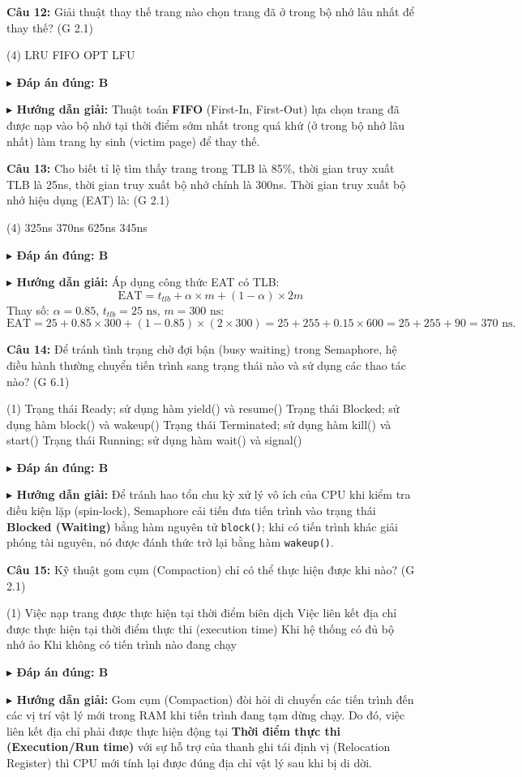 \documentclass[11pt,a4paper]{article}
\newcommand{\giaithich}[2]{%
    \par\vspace{0.15cm}\noindent
    \begingroup\small
    \noindent\textbf{\color{blue}$\blacktriangleright$ Đáp án đúng: #1} \par\vspace{0.08cm}
    \noindent\textbf{\color{teal}$\blacktriangleright$ Hướng dẫn giải:} #2
    \endgroup\par\vspace{0.35cm}
}
\begin{document}
\noindent\textbf{Câu 12:} Giải thuật thay thế trang nào chọn trang đã ở trong bộ nhớ lâu nhất để thay thế? (G 2.1)
\begin{tasks}(4)
    \task LRU
    \task FIFO
    \task OPT
    \task LFU
\end{tasks}
\giaithich{B}{Thuật toán \textbf{FIFO} (First-In, First-Out) lựa chọn trang đã được nạp vào bộ nhớ tại thời điểm sớm nhất trong quá khứ (ở trong bộ nhớ lâu nhất) làm trang hy sinh (victim page) để thay thế.}

\noindent\textbf{Câu 13:} Cho biết tỉ lệ tìm thấy trang trong TLB là 85\%, thời gian truy xuất TLB là 25ns, thời gian truy xuất bộ nhớ chính là 300ns. Thời gian truy xuất bộ nhớ hiệu dụng (EAT) là: (G 2.1)
\begin{tasks}(4)
    \task 325ns
    \task 370ns
    \task 625ns
    \task 345ns
\end{tasks}
\giaithich{B}{Áp dụng công thức EAT có TLB:
$$\text{EAT} = t_{tlb} + \alpha \times m + (1 - \alpha) \times 2m$$
Thay số: $\alpha = 0.85$, $t_{tlb} = 25\text{ ns}$, $m = 300\text{ ns}$:
$$\text{EAT} = 25 + 0.85 \times 300 + (1 - 0.85) \times (2 \times 300) = 25 + 255 + 0.15 \times 600 = 25 + 255 + 90 = 370\text{ ns.}$$}

\noindent\textbf{Câu 14:} Để tránh tình trạng chờ đợi bận (busy waiting) trong Semaphore, hệ điều hành thường chuyển tiến trình sang trạng thái nào và sử dụng các thao tác nào? (G 6.1)
\begin{tasks}(1)
    \task Trạng thái Ready; sử dụng hàm yield() và resume()
    \task Trạng thái Blocked; sử dụng hàm block() và wakeup()
    \task Trạng thái Terminated; sử dụng hàm kill() và start()
    \task Trạng thái Running; sử dụng hàm wait() và signal()
\end{tasks}
\giaithich{B}{Để tránh hao tổn chu kỳ xử lý vô ích của CPU khi kiểm tra điều kiện lặp (spin-lock), Semaphore cải tiến đưa tiến trình vào trạng thái \textbf{Blocked (Waiting)} bằng hàm nguyên tử \texttt{block()}; khi có tiến trình khác giải phóng tài nguyên, nó được đánh thức trở lại bằng hàm \texttt{wakeup()}.}

\noindent\textbf{Câu 15:} Kỹ thuật gom cụm (Compaction) chỉ có thể thực hiện được khi nào? (G 2.1)
\begin{tasks}(1)
    \task Việc nạp trang được thực hiện tại thời điểm biên dịch
    \task Việc liên kết địa chỉ được thực hiện tại thời điểm thực thi (execution time)
    \task Khi hệ thống có đủ bộ nhớ ảo
    \task Khi không có tiến trình nào đang chạy
\end{tasks}
\giaithich{B}{Gom cụm (Compaction) đòi hỏi di chuyển các tiến trình đến các vị trí vật lý mới trong RAM khi tiến trình đang tạm dừng chạy. Do đó, việc liên kết địa chỉ phải được thực hiện động tại \textbf{Thời điểm thực thi (Execution/Run time)} với sự hỗ trợ của thanh ghi tái định vị (Relocation Register) thì CPU mới tính lại được đúng địa chỉ vật lý sau khi bị di dời.}
\end{document}
